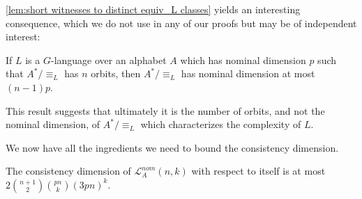 \documentclass[runningheads]{llncs}
\newcommand{\mc}{\mathcal}
\newif\ifappendix
\begin{document}
\autoref{lem:short witnesses to distinct equiv_L classes} yields an interesting consequence, which we do not use in any of our proofs but may be of independent interest:

\begin{corollary} \label{cor:dimension of A^*/equiv_L bounded in terms of orbits}
    If $L$ is a $G$-language over an alphabet $A$ which has nominal dimension $p$ such that $A^* / \equiv_L$ has $n$ orbits, then $A^* / \equiv_L$ has nominal dimension at most $(n-1)p$.
\end{corollary}

This result suggests that ultimately it is the number of orbits, and not the nominal dimension, of $A^* / \equiv_L$ which characterizes the complexity of $L$.
\ifappendix Its proof is given in Appendix \ref{appendix:proof of dimension of A^*/equiv_L bounded in terms of orbits}. \fi

\bigskip

We now have all the ingredients we need to bound the consistency dimension.

\begin{proposition} \label{prop:consistency dimension of nominal automata}
    The consistency dimension of $\mc L^{nom}_A(n,k)$ with respect to itself is at most $2 \binom{n+1}{2} \binom{pn}{k} (3pn)^k$.
\end{proposition}
\end{document}
